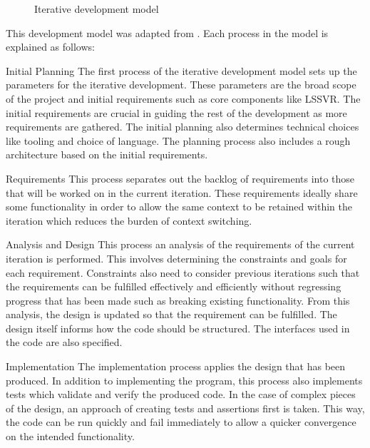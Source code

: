 \begin{figure}[H]
      \centering
      \begin{adjustbox}{max width=\textwidth}
      \end{adjustbox}
      \caption{Iterative development model}\label{fig:iterative_development_diagram}
\end{figure}

This development model was adapted from \textcite{bittnerManagingIterativeSoftware2006}. Each process in the model is explained as follows:
\begin{numdesc}
      \item[Initial Planning]
      The first process of the iterative development model sets up the parameters for the iterative development. These parameters are the broad scope of the project and initial requirements such as core components like LSSVR\@. The initial requirements are crucial in guiding the rest of the development as more requirements are gathered. The initial planning also determines technical choices like tooling and choice of language. The planning process also includes a rough architecture based on the initial requirements.

      \item[Requirements]
      This process separates out the backlog of requirements into those that will be worked on in the current iteration. These requirements ideally share some functionality in order to allow the same context to be retained within the iteration which reduces the burden of context switching.

      \item[Analysis and Design]
      This process an analysis of the requirements of the current iteration is performed. This involves determining the constraints and goals for each requirement. Constraints also need to consider previous iterations such that the requirements can be fulfilled effectively and efficiently without regressing progress that has been made such as breaking existing functionality. From this analysis, the design is updated so that the requirement can be fulfilled. The design itself informs how the code should be structured. The interfaces used in the code are also specified.

      \item[Implementation]
      The implementation process applies the design that has been produced. In addition to implementing the program, this process also implements tests which validate and verify the produced code. In the case of complex pieces of the design, an approach of creating tests and assertions first is taken. This way, the code can be run quickly and fail immediately to allow a quicker convergence on the intended functionality.


\end{numdesc}
